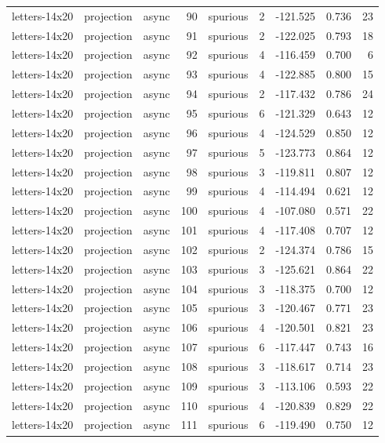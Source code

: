 \begin{tabular}{lllrlrrrr}
letters-14x20 & projection & async & 90 & spurious & 2 & -121.525 & 0.736 & 23 \\
letters-14x20 & projection & async & 91 & spurious & 2 & -122.025 & 0.793 & 18 \\
letters-14x20 & projection & async & 92 & spurious & 4 & -116.459 & 0.700 & 6 \\
letters-14x20 & projection & async & 93 & spurious & 4 & -122.885 & 0.800 & 15 \\
letters-14x20 & projection & async & 94 & spurious & 2 & -117.432 & 0.786 & 24 \\
letters-14x20 & projection & async & 95 & spurious & 6 & -121.329 & 0.643 & 12 \\
letters-14x20 & projection & async & 96 & spurious & 4 & -124.529 & 0.850 & 12 \\
letters-14x20 & projection & async & 97 & spurious & 5 & -123.773 & 0.864 & 12 \\
letters-14x20 & projection & async & 98 & spurious & 3 & -119.811 & 0.807 & 12 \\
letters-14x20 & projection & async & 99 & spurious & 4 & -114.494 & 0.621 & 12 \\
letters-14x20 & projection & async & 100 & spurious & 4 & -107.080 & 0.571 & 22 \\
letters-14x20 & projection & async & 101 & spurious & 4 & -117.408 & 0.707 & 12 \\
letters-14x20 & projection & async & 102 & spurious & 2 & -124.374 & 0.786 & 15 \\
letters-14x20 & projection & async & 103 & spurious & 3 & -125.621 & 0.864 & 22 \\
letters-14x20 & projection & async & 104 & spurious & 3 & -118.375 & 0.700 & 12 \\
letters-14x20 & projection & async & 105 & spurious & 3 & -120.467 & 0.771 & 23 \\
letters-14x20 & projection & async & 106 & spurious & 4 & -120.501 & 0.821 & 23 \\
letters-14x20 & projection & async & 107 & spurious & 6 & -117.447 & 0.743 & 16 \\
letters-14x20 & projection & async & 108 & spurious & 3 & -118.617 & 0.714 & 23 \\
letters-14x20 & projection & async & 109 & spurious & 3 & -113.106 & 0.593 & 22 \\
letters-14x20 & projection & async & 110 & spurious & 4 & -120.839 & 0.829 & 22 \\
letters-14x20 & projection & async & 111 & spurious & 6 & -119.490 & 0.750 & 12 \\

\end{tabular}
